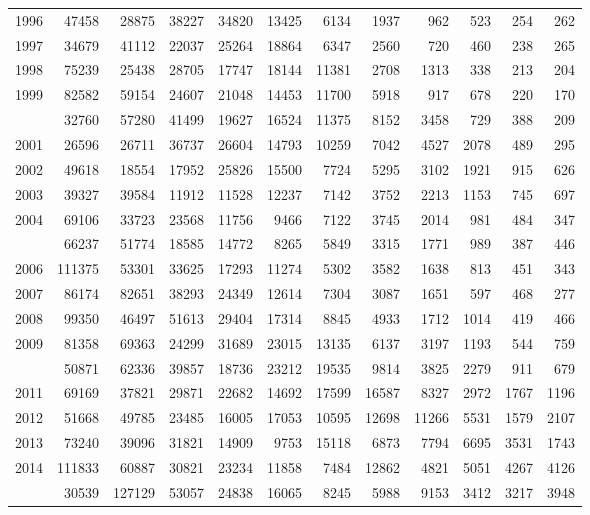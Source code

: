 \documentclass[
]{article}
\begin{document}
\begin{longtable}[t]{lrrrrrrrrrrr}
1996 & 47458 & 28875 & 38227 & 34820 & 13425 & 6134 & 1937 & 962 & 523 & 254 & 262\\
1997 & 34679 & 41112 & 22037 & 25264 & 18864 & 6347 & 2560 & 720 & 460 & 238 & 265\\
1998 & 75239 & 25438 & 28705 & 17747 & 18144 & 11381 & 2708 & 1313 & 338 & 213 & 204\\
1999 & 82582 & 59154 & 24607 & 21048 & 14453 & 11700 & 5918 & 917 & 678 & 220 & 170\\
\addlinespace
2000 & 32760 & 57280 & 41499 & 19627 & 16524 & 11375 & 8152 & 3458 & 729 & 388 & 209\\
2001 & 26596 & 26711 & 36737 & 26604 & 14793 & 10259 & 7042 & 4527 & 2078 & 489 & 295\\
2002 & 49618 & 18554 & 17952 & 25826 & 15500 & 7724 & 5295 & 3102 & 1921 & 915 & 626\\
2003 & 39327 & 39584 & 11912 & 11528 & 12237 & 7142 & 3752 & 2213 & 1153 & 745 & 697\\
2004 & 69106 & 33723 & 23568 & 11756 & 9466 & 7122 & 3745 & 2014 & 981 & 484 & 347\\
\addlinespace
2005 & 66237 & 51774 & 18585 & 14772 & 8265 & 5849 & 3315 & 1771 & 989 & 387 & 446\\
2006 & 111375 & 53301 & 33625 & 17293 & 11274 & 5302 & 3582 & 1638 & 813 & 451 & 343\\
2007 & 86174 & 82651 & 38293 & 24349 & 12614 & 7304 & 3087 & 1651 & 597 & 468 & 277\\
2008 & 99350 & 46497 & 51613 & 29404 & 17314 & 8845 & 4933 & 1712 & 1014 & 419 & 466\\
2009 & 81358 & 69363 & 24299 & 31689 & 23015 & 13135 & 6137 & 3197 & 1193 & 544 & 759\\
\addlinespace
2010 & 50871 & 62336 & 39857 & 18736 & 23212 & 19535 & 9814 & 3825 & 2279 & 911 & 679\\
2011 & 69169 & 37821 & 29871 & 22682 & 14692 & 17599 & 16587 & 8327 & 2972 & 1767 & 1196\\
2012 & 51668 & 49785 & 23485 & 16005 & 17053 & 10595 & 12698 & 11266 & 5531 & 1579 & 2107\\
2013 & 73240 & 39096 & 31821 & 14909 & 9753 & 15118 & 6873 & 7794 & 6695 & 3531 & 1743\\
2014 & 111833 & 60887 & 30821 & 23234 & 11858 & 7484 & 12862 & 4821 & 5051 & 4267 & 4126\\
\addlinespace
2015 & 30539 & 127129 & 53057 & 24838 & 16065 & 8245 & 5988 & 9153 & 3412 & 3217 & 3948\\

\end{longtable}
\end{document}
